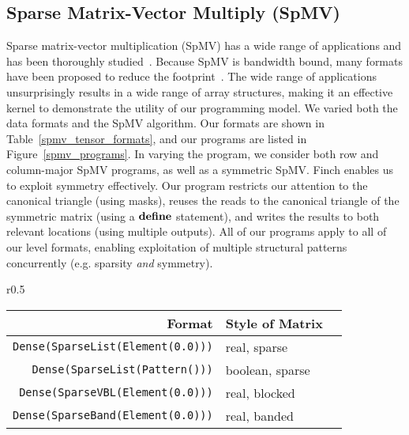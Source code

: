   \subsection{Sparse Matrix-Vector Multiply (SpMV)}
  Sparse matrix-vector multiplication (SpMV) has a wide range of applications and has been thoroughly studied~\cite{liu_csr5_2015,
  zhou_enabling_2020}. 
  Because SpMV is bandwidth bound, many formats have
  been proposed to reduce the footprint~\cite{langr_evaluation_2016}. 
  The wide range of applications unsurprisingly
  results in a wide range of array structures, making it an effective kernel to
  demonstrate the utility of our programming model. 
  We varied both the data formats and the SpMV algorithm. 
  Our formats
  are shown in Table~\ref{spmv_tensor_formats}, and our programs are listed in
  Figure~\ref{spmv_programs}.
  In varying the program, we consider both row and column-major SpMV programs, as
  well as a symmetric SpMV. 
  Finch enables us to exploit symmetry
  effectively.
  Our program restricts our attention to the canonical triangle (using
  masks), reuses the reads to the canonical triangle of the symmetric matrix
  (using a $\text{\textbf{define}}$ statement), and writes the results to both relevant
  locations (using multiple outputs).
  All of our programs apply to all of our level formats, enabling exploitation of multiple structural patterns concurrently (e.g. sparsity \textit{and} symmetry).
   
  \begin{wrapfigure}{r}{0.5\linewidth}
    \scriptsize
    \centering
    \vspace{-16pt}
    \begin{tabular}{|r|l|l|}
        \hline
        \textbf{Format} & \textbf{Style of Matrix}\\
        \hline
        \texttt{Dense(SparseList(Element(0.0)))} & real, sparse \\
        \texttt{Dense(SparseList(Pattern()))} & boolean, sparse \\
        \texttt{Dense(SparseVBL(Element(0.0)))} & real, blocked \\
        \texttt{Dense(SparseBand(Element(0.0)))} & real, banded \\
        \hline 
    \end{tabular}
      \vspace{-8pt}
    \caption{SpMV Tensor Formats}
    \label{spmv_tensor_formats}
    \vspace{-8pt}
  \end{wrapfigure} 


